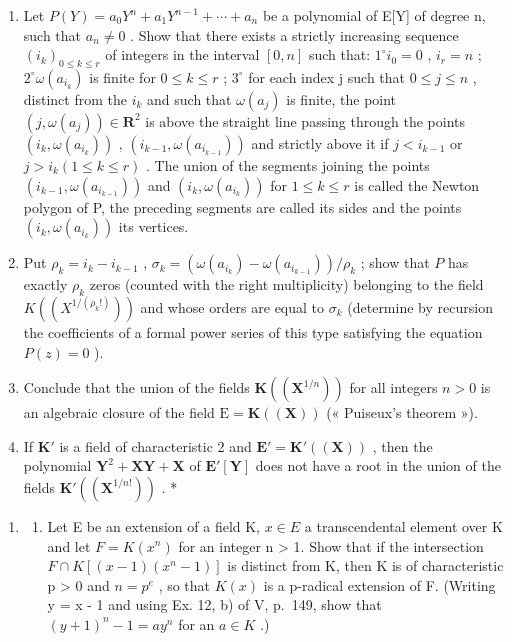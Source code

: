 \begin{enumerate}
\def\labelenumi{\alph{enumi})}
\item
  Let \(P(Y) = a_{0}Y^{n} + a_{1}Y^{n-1} + \cdots + a_{n}\) be a polynomial of E{[}Y{]} of degree n, such that \(a_{n} \neq 0\) . Show that there exists a strictly increasing sequence \((i_{k})_{0 \leqslant k \leqslant r}\) of integers in the interval \([0, n]\) such that: \(1^{\circ} i_{0} = 0\) , \(i_{r} = n\) ; \(2^{\circ} \omega(a_{i_{k}})\) is finite for \(0 \leqslant k \leqslant r\) ; \(3^{\circ}\) for each index j such that \(0 \leqslant j \leqslant n\) , distinct from the \(i_{k}\) and such that \(\omega(a_{j})\) is finite, the point \((j, \omega(a_{j})) \in \mathbf{R}^{2}\) is above the straight line passing through the points \((i_{k}, \omega(a_{i_{k}}))\) , \((i_{k-1}, \omega(a_{i_{k-1}}))\) and strictly above it if \(j < i_{k-1}\) or \(j > i_{k} (1 \leqslant k \leqslant r)\) . The union of the segments joining the points \((i_{k-1}, \omega(a_{i_{k-1}}))\) and \((i_{k}, \omega(a_{i_{k}}))\) for \(1 \leqslant k \leqslant r\) is called the Newton polygon of P, the preceding segments are called its sides and the points \((i_{k}, \omega(a_{i_{k}}))\) its vertices.
\item
  Put \(\rho_{k} = i_{k} - i_{k - 1}\) , \(\sigma_{k} = (\omega (a_{i_{k}}) - \omega (a_{i_{k - 1}})) / \rho_{k}\) ; show that \(P\) has exactly \(\rho_{k}\) zeros (counted with the right multiplicity) belonging to the field \(K((X^{1 / (\rho_k!)}))\) and whose orders are equal to \(\sigma_{k}\) (determine by recursion the coefficients of a formal power series of this type satisfying the equation \(P(z) = 0\) ).
\item
  Conclude that the union of the fields \(\mathbf{K}((\mathbf{X}^{1 / n}))\) for all integers \(n > 0\) is an algebraic closure of the field \(\mathrm{E} = \mathbf{K}((\mathbf{X}))\) (« Puiseux's theorem »).
\item
  If \(\mathbf{K}'\) is a field of characteristic 2 and \(\mathbf{E}' = \mathbf{K}'((\mathbf{X}))\) , then the polynomial \(\mathbf{Y}^2 + \mathbf{X}\mathbf{Y} + \mathbf{X}\) of \(\mathbf{E}'[\mathbf{Y}]\) does not have a root in the union of the fields \(\mathbf{K}'((\mathbf{X}^{1/n!}))\) . *
\end{enumerate}

\BourbakiExerciseGroup

\begin{enumerate}
\def\labelenumi{\arabic{enumi})}
\tightlist
\item
  \begin{enumerate}
  \def\labelenumii{\alph{enumii})}
  \tightlist
  \item
    Let E be an extension of a field K, \(x \in E\) a transcendental element over K and let \(F = K(x^{n})\) for an integer n \textgreater{} 1. Show that if the intersection \(F \cap K[(x - 1)(x^{n} - 1)]\) is distinct from K, then K is of characteristic p \textgreater{} 0 and \(n = p^{e}\) , so that \(K(x)\) is a p-radical extension of F. (Writing y = x - 1 and using Ex. 12, b) of V, p.~149, show that \((y + 1)^{n} - 1 = ay^{n}\) for an \(a \in K\) .)
  \end{enumerate}
\end{enumerate}

